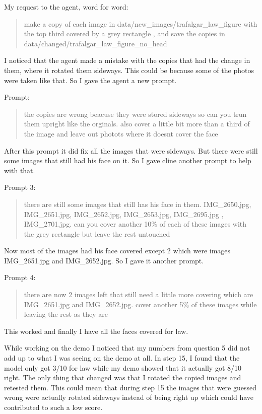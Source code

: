 \documentclass[11pt]{article}
\begin{document}
My request to the agent, word for word:
\begin{quote}
make a copy of each image in data/new\_images/trafalgar\_law\_figure with the
top third covered by a grey rectangle , and save the copies in
data/changed/trafalgar\_law\_figure\_no\_head
\end{quote}

I noticed that the agent made a mistake with the copies that had the change in
them, where it rotated them sideways. This could be because some of the photos
were taken like that. So I gave the agent a new prompt.

Prompt:
\begin{quote}
the copies are wrong beacuse they were stored sideways so can you trun them
upright like the orginals. also cover a little bit more than a third of the
image and leave out photots where it doesnt cover the face
\end{quote}

After this prompt it did fix all the images that were sideways. But there were
still some images that still had his face on it. So I gave cline another
prompt to help with that.

Prompt 3:
\begin{quote}
there are still some images that still has his face in them. IMG\_2650.jpg,
IMG\_2651.jpg, IMG\_2652.jpg, IMG\_2653.jpg, IMG\_2695.jpg , IMG\_2701.jpg.
can you cover another 10\% of each of these images with the grey rectangle but
leave the rest untouched
\end{quote}

Now most of the images had his face covered except 2 which were images
IMG\_2651.jpg and IMG\_2652.jpg. So I gave it another prompt.

Prompt 4:
\begin{quote}
there are now 2 images left that still need a little more covering which are
IMG\_2651.jpg and IMG\_2652.jpg. cover another 5\% of these images while
leaving the rest as they are
\end{quote}

This worked and finally I have all the faces covered for law.

While working on the demo I noticed that my numbers from question 5 did not
add up to what I was seeing on the demo at all. In step 15, I found that the
model only got 3/10 for law while my demo showed that it actually got 8/10
right. The only thing that changed was that I rotated the copied images and
retested them. This could mean that during step 15 the images that were
guessed wrong were actually rotated sideways instead of being right up which
could have contributed to such a low score.
\end{document}
